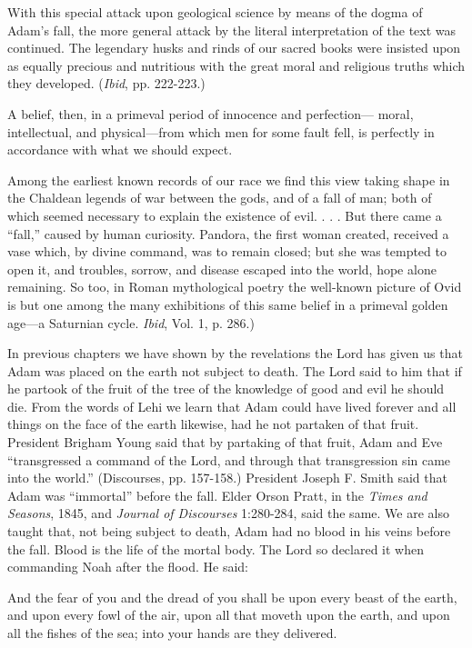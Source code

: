 With this special attack upon geological science by means of the dogma of Adam's fall, the
more general attack by the literal interpretation of the text was continued. The legendary
husks and rinds of our sacred books were insisted upon as equally precious and nutritious
with the great moral and religious truths which they developed. (\textit{Ibid}, pp. 222-223.)

A belief, then, in a primeval period of innocence and perfection— moral, intellectual, and
physical—from which men for some fault fell, is perfectly in accordance with what we
should expect.

Among the earliest known records of our race we find this view taking shape in the Chaldean
legends of war between the gods, and of a fall of man; both of which seemed necessary to
explain the existence of evil. . . . But there came a ``fall,'' caused by human curiosity.
Pandora, the first woman created, received a vase which, by divine command, was to remain
closed; but she was tempted to open it, and troubles, sorrow, and disease escaped into the
world, hope alone remaining. So too, in Roman mythological poetry the well-known picture
of Ovid is but one among the many exhibitions of this same belief in a primeval golden
age—a Saturnian cycle. \textit{Ibid}, Vol. 1, p. 286.)

In previous chapters we have shown by the revelations the Lord has given us that Adam was
placed on the earth not subject to death. The Lord said to him that if he partook of the fruit of
the tree of the knowledge of good and evil he should die. From the words of Lehi we learn
that Adam could have lived forever and all things on the face of the earth likewise, had he
not partaken of that fruit. President Brigham Young said that by partaking of that fruit, Adam
and Eve ``transgressed a command of the Lord, and through that transgression sin came into
the world.'' (Discourses, pp. 157-158.) President Joseph F. Smith said that Adam was
``immortal'' before the fall. Elder Orson Pratt, in the \textit{Times and Seasons}, 1845, and \textit{Journal of
Discourses} 1:280-284, said the same. We are also taught that, not being subject to death,
Adam had no blood in his veins before the fall. Blood is the life of the mortal body. The Lord
so declared it when commanding Noah after the flood. He said:

And the fear of you and the dread of you shall be upon every beast of the earth, and upon
every fowl of the air, upon all that moveth upon the earth, and upon all the fishes of the sea;
into your hands are they delivered.

